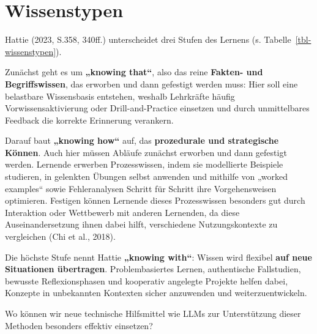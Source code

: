 \documentclass[
  ngerman,
  letterpaper,
  DIV=11]{scrreprt}
\begin{document}
\section{Wissenstypen}\label{sec-wissenstypen}

Hattie (2023, S.358, 340ff.) unterscheidet drei Stufen des Lernens (s.
Tabelle~\ref{tbl-wissenstypen}).

Zunächst geht es um \textbf{„knowing that``}, also das reine
\textbf{Fakten- und Begriffswissen}, das erworben und dann gefestigt
werden muss: Hier soll eine belastbare Wissensbasis entstehen, weshalb
Lehrkräfte häufig Vorwissensaktivierung oder Drill-and-Practice
einsetzen und durch unmittelbares Feedback die korrekte Erinnerung
verankern.

Darauf baut \textbf{„knowing how``} auf, das \textbf{prozedurale und
strategische Können}. Auch hier müssen Abläufe zunächst erworben und
dann gefestigt werden. Lernende erwerben Prozesswissen, indem sie
modellierte Beispiele studieren, in gelenkten Übungen selbst anwenden
und mithilfe von „worked examples`` sowie Fehleranalysen Schritt für
Schritt ihre Vorgehensweisen optimieren. Festigen können Lernende dieses
Prozesswissen besonders gut durch Interaktion oder Wettbewerb mit
anderen Lernenden, da diese Auseinandersetzung ihnen dabei hilft,
verschiedene Nutzungskontexte zu vergleichen (Chi et al., 2018).

Die höchste Stufe nennt Hattie \textbf{„knowing with``}: Wissen wird
flexibel \textbf{auf neue Situationen übertragen}. Problembasiertes
Lernen, authentische Fallstudien, bewusste Reflexionsphasen und
kooperativ angelegte Projekte helfen dabei, Konzepte in unbekannten
Kontexten sicher anzuwenden und weiterzuentwickeln.

Wo können wir neue technische Hilfsmittel wie LLMs zur Unterstützung
dieser Methoden besonders effektiv einsetzen?
\end{document}
